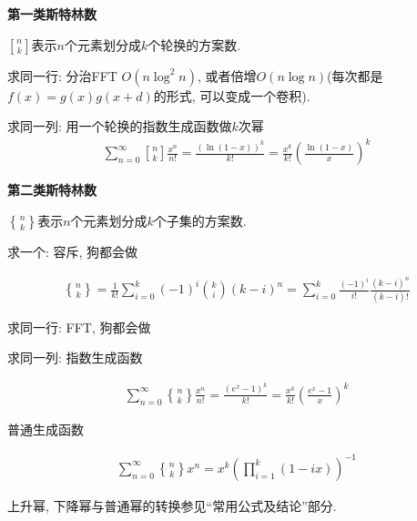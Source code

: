 \textbf{第一类斯特林数}

$n\brack k$表示$n$个元素划分成$k$个轮换的方案数.

求同一行: 分治FFT $O(n\log ^2 n)$, 或者倍增$O(n\log n)$(每次都是$f(x) = g(x) g(x + d)$的形式, 可以变成一个卷积).

求同一列: 用一个轮换的指数生成函数做$k$次幂
$$\begin{aligned} \sum_{n = 0} ^ \infty {n \brack k} \frac {x ^ n} {n!} = \frac {\left(\ln (1 - x)\right) ^ k} {k!} = \frac {x ^ k} {k!} \left( \frac {\ln (1 - x)} x \right) ^ k \end{aligned}$$

\textbf{第二类斯特林数}

$n\brace k$表示$n$个元素划分成$k$个子集的方案数.

求一个: 容斥, 狗都会做

$$\begin{aligned} {n \brace k} = \frac 1 {k!} \sum_{i = 0} ^ k (-1) ^ i {k \choose i} (k - i) ^ n = \sum_{i = 0} ^ k \frac {(-1) ^ i} {i!} \frac {(k - i) ^ n} {(k - i)!} \end{aligned}$$

求同一行: FFT, 狗都会做

求同一列: 指数生成函数

$$\begin{aligned} \sum_{n = 0} ^ \infty {n \brace k} \frac {x ^ n} {n!} = \frac {\left(e ^ x - 1\right) ^ k} {k!} = \frac {x ^ k} {k!} \left( \frac {e ^ x - 1} x \right) ^ k \end{aligned}$$

普通生成函数

$$\begin{aligned} \sum_{n = 0} ^ \infty {n \brace k} x ^ n = x ^ k \left(\prod_{i = 1} ^ k (1 - i x)\right) ^ {-1} \end{aligned}$$

上升幂, 下降幂与普通幂的转换参见“常用公式及结论”部分.